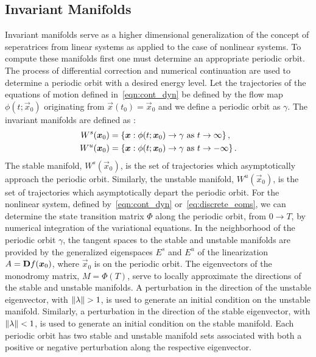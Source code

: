\documentclass[preprint]{elsarticle}
\begin{document}
\subsection{Invariant Manifolds}\label{sec:invariant_manifold}
Invariant manifolds serve as a higher dimensional generalization of the concept of seperatrices from linear systems as applied to the case of nonlinear systems. 
To compute these manifolds first one must determine an appropriate periodic orbit. 
The process of differential correction and numerical continuation are used to determine a periodic orbit with a desired energy level. 
Let the trajectories of the equations of motion defined in~\cref{eqn:cont_dyn} be defined by the flow map \( \phi(t;\vec{x}_0) \) originating from \( \vec{x}(t_0) = \vec{x}_0 \) and we define a periodic orbit as \( \gamma\).
The invariant manifolds are defined as : 
\begin{align*}
	W^s ( \boldsymbol{x}_0 ) &= \left\{  \boldsymbol{x} : \phi(t;\boldsymbol{x}_0) \to \gamma \text{ as } t \to \infty \right\} , \\
	W^u ( \boldsymbol{x}_0 ) &= \left\{  \boldsymbol{x} : \phi(t;\boldsymbol{x}_0) \to \gamma \text{ as } t \to -\infty \right\} .
\end{align*}
The stable manifold, \( W^s(\vec{x}_0) \), is the set of trajectories which asymptotically approach the periodic orbit.
Similarly, the unstable manifold, \( W^u(\vec{x}_0) \), is the set of trajectories which asymptotically depart the periodic orbit.
For the nonlinear system, defined by~\cref{eqn:cont_dyn} or~\cref{eq:discrete_eoms}, we can determine the state transition matrix \( \Phi \) along the periodic orbit, from \( 0 \to T\), by numerical integration of the variational equations.
In the neighborhood of the periodic orbit \( \gamma \), the tangent spaces to the stable and unstable manifolds are provided by the generalized eigenspaces \( E^s \) and \( E^u \) of the linearization \( A = \mathbf{D} f(\boldsymbol{x}_0) \), where \( \vec{x}_0 \) is on the periodic orbit.
The eigenvectors of the monodromy matrix, \( M = \Phi(T) \), serve to locally approximate the directions of the stable and unstable manifolds. 
A perturbation in the direction of the unstable eigenvector, with \( \left\| \lambda \right\| > 1 \), is used to generate an initial condition on the unstable manifold. 
Similarly, a perturbation in the direction of the stable eigenvector, with \( \left\| \lambda \right\| < 1 \), is used to generate an initial condition on the stable manifold. 
Each periodic orbit has two stable and unstable manifold sets associated with both a positive or negative perturbation along the respective eigenvector.
\end{document}
